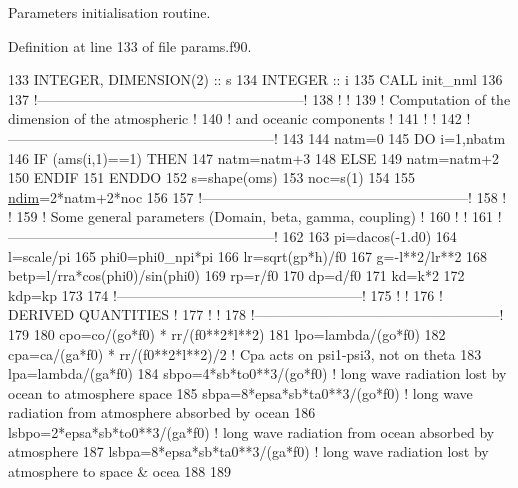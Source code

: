 Parameters initialisation routine. 



Definition at line 133 of file params.\+f90.


\begin{DoxyCode}
133     \textcolor{keywordtype}{INTEGER}, \textcolor{keywordtype}{DIMENSION(2)} :: s
134     \textcolor{keywordtype}{INTEGER} :: i
135     \textcolor{keyword}{CALL }init\_nml
136 
137     \textcolor{comment}{!---------------------------------------------------------!}
138     \textcolor{comment}{!                                                         !}
139     \textcolor{comment}{! Computation of the dimension of the atmospheric         !}
140     \textcolor{comment}{! and oceanic components                                  !}
141     \textcolor{comment}{!                                                         !}
142     \textcolor{comment}{!---------------------------------------------------------!}
143 
144     natm=0
145     \textcolor{keywordflow}{DO} i=1,nbatm
146        \textcolor{keywordflow}{IF} (ams(i,1)==1) \textcolor{keywordflow}{THEN}
147           natm=natm+3
148        \textcolor{keywordflow}{ELSE}
149           natm=natm+2
150 \textcolor{keywordflow}{       ENDIF}
151 \textcolor{keywordflow}{    ENDDO}
152     s=shape(oms)
153     noc=s(1)
154 
155     \hyperlink{namespaceparams_a2323fe1773f086e20c14f266351c482b}{ndim}=2*natm+2*noc
156 
157     \textcolor{comment}{!---------------------------------------------------------!}
158     \textcolor{comment}{!                                                         !}
159     \textcolor{comment}{! Some general parameters (Domain, beta, gamma, coupling) !}
160     \textcolor{comment}{!                                                         !}
161     \textcolor{comment}{!---------------------------------------------------------!}
162 
163     pi=dacos(-1.d0)
164     l=scale/pi
165     phi0=phi0\_npi*pi
166     lr=sqrt(gp*h)/f0
167     g=-l**2/lr**2
168     betp=l/rra*cos(phi0)/sin(phi0)
169     rp=r/f0
170     dp=d/f0
171     kd=k*2
172     kdp=kp
173 
174     \textcolor{comment}{!-----------------------------------------------------!}
175     \textcolor{comment}{!                                                     !}
176     \textcolor{comment}{! DERIVED QUANTITIES                                  !}
177     \textcolor{comment}{!                                                     !}
178     \textcolor{comment}{!-----------------------------------------------------!}
179 
180     cpo=co/(go*f0) * rr/(f0**2*l**2)
181     lpo=lambda/(go*f0)
182     cpa=ca/(ga*f0) * rr/(f0**2*l**2)/2 \textcolor{comment}{! Cpa acts on psi1-psi3, not on theta}
183     lpa=lambda/(ga*f0)
184     sbpo=4*sb*to0**3/(go*f0) \textcolor{comment}{! long wave radiation lost by ocean to atmosphere space}
185     sbpa=8*epsa*sb*ta0**3/(go*f0) \textcolor{comment}{! long wave radiation from atmosphere absorbed by ocean}
186     lsbpo=2*epsa*sb*to0**3/(ga*f0) \textcolor{comment}{! long wave radiation from ocean absorbed by atmosphere}
187     lsbpa=8*epsa*sb*ta0**3/(ga*f0) \textcolor{comment}{! long wave radiation lost by atmosphere to space & ocea}
188 
189 
\end{DoxyCode}


